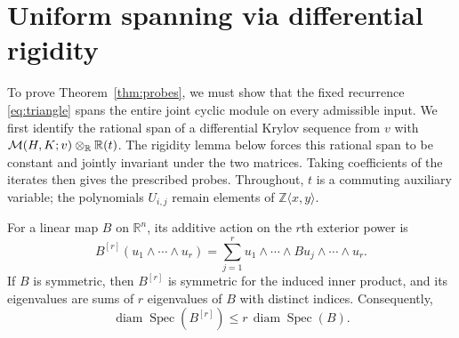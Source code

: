\documentclass[11pt,letterpaper]{article}
\theoremstyle{definition}\newtheorem{definition}[theorem]{Definition}
\theoremstyle{remark}\newtheorem{remark}[theorem]{Remark}
\DeclareMathOperator{\diam}{diam}\DeclareMathOperator{\Spec}{Spec}
\newcommand{\R}{\mathbb R}\newcommand{\Q}{\mathbb Q}\newcommand{\Z}{\mathbb Z}
\begin{document}
\section{Uniform spanning via differential rigidity}\label{sec:spanning}
To prove Theorem~\ref{thm:probes}, we must show that the fixed recurrence
\eqref{eq:triangle} spans the entire joint cyclic module on every admissible
input. We first identify the rational span of a differential Krylov sequence
from $v$ with $\M(H,K;v)\otimes_\R\R(t)$. The rigidity lemma below forces
this rational span to be constant and jointly invariant under the two matrices.
Taking coefficients of the iterates then gives the prescribed probes.
Throughout, $t$ is a commuting auxiliary variable; the polynomials $U_{i,j}$
remain elements of $\Z\langle x,y\rangle$.

For a linear map $B$ on $\R^n$, its additive action on the $r$th exterior power is
\[
B^{[r]}(u_1\wedge\cdots\wedge u_r)
=\sum_{j=1}^r u_1\wedge\cdots\wedge Bu_j\wedge\cdots\wedge u_r.
\]
If $B$ is symmetric, then $B^{[r]}$ is symmetric for the induced inner product,
and its eigenvalues are sums of $r$ eigenvalues of $B$ with distinct indices.
Consequently,
\begin{equation}\label{eq:diam}
\diam\Spec(B^{[r]})\le r\,\diam\Spec(B).
\end{equation}
\end{document}

